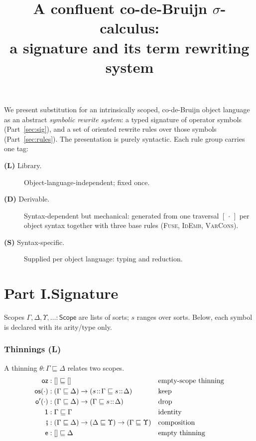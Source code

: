 \documentclass{article}
\newcommand{\Scope}{\mathsf{Scope}}
\newcommand{\thin}{\sqsubseteq}                    %
\newcommand{\oz}{\mathsf{oz}}
\newcommand{\os}{\mathsf{os}}
\newcommand{\od}{\mathsf{o'}}
\newcommand{\oi}{\mathsf{1}}                        %
\renewcommand{\oe}{\mathsf{e}}                      %
\newcommand{\comp}{\mathbin{\fatsemi}}              %
\newcommand{\ins}[1]{[\,#1\,]}                      %
\newcommand{\catL}{\textbf{(L)}}
\newcommand{\catD}{\textbf{(D)}}
\newcommand{\catS}{\textbf{(S)}}
\theoremstyle{plain}
\begin{document}
\title{A confluent co-de-Bruijn $\sigma$-calculus:\\a signature and its term rewriting system}
\author{}\date{}\maketitle

\noindent
We present substitution for an intrinsically scoped, co-de-Bruijn object language as an
abstract \emph{symbolic rewrite system}: a typed signature of operator symbols
(Part~\ref{sec:sig}), and a set of oriented rewrite rules over those symbols
(Part~\ref{sec:rules}).
The presentation is purely syntactic.
Each rule group carries one tag:
\begin{description}
  \item[\catL{} Library.] Object-language-independent; fixed once.
  \item[\catD{} Derivable.] Syntax-dependent but mechanical: generated from one
        traversal $\ins\cdot$ per object syntax together with three base rules
        (\textsc{Fuse}, \textsc{IdEmb}, \textsc{VarCons}).
  \item[\catS{} Syntax-specific.] Supplied per object language: typing and reduction.
\end{description}

\part*{Part I.\quad Signature}\label{sec:sig}

\noindent
Scopes $\Gamma,\Delta,\Upsilon,\dots : \Scope$ are lists of sorts; $s$ ranges over sorts.
Below, each symbol is declared with its arity/type only.

\section{Thinnings \hfill \catL}\label{sig:thin}

A thinning $\theta : \Gamma\thin\Delta$ relates two scopes.
\begin{align*}
  \oz       &: [] \thin []
    && \text{empty-scope thinning}\\
  \os(\cdot) &: (\Gamma\thin\Delta) \to (s\!::\!\Gamma \thin s\!::\!\Delta)
    && \text{keep}\\
  \od(\cdot) &: (\Gamma\thin\Delta) \to (\Gamma \thin s\!::\!\Delta)
    && \text{drop}\\
  \oi       &: \Gamma\thin\Gamma
    && \text{identity}\\
  \comp     &: (\Gamma\thin\Delta)\to(\Delta\thin\Upsilon)\to(\Gamma\thin\Upsilon)
    && \text{composition}\\
  \oe       &: [] \thin \Delta
    && \text{empty thinning}
\end{align*}
\end{document}
